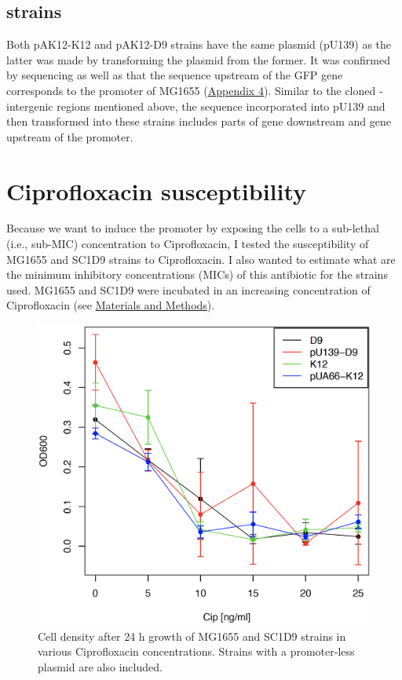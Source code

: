 \subsection{ strains}
Both pA\textunderscore K12-K12 and pA\textunderscore K12-D9 strains have the same plasmid (pU139) as the latter was made by transforming the plasmid from the former.
It was confirmed by sequencing as well as that the sequence upstream of the GFP gene corresponds to the  promoter of MG1655 (\hyperlink{precAalign}{Appendix 4}).
Similar to the cloned - intergenic regions mentioned above, the sequence incorporated into pU139 and then transformed into these  strains includes parts of  gene downstream and  gene upstream of the promoter.


\section{Ciprofloxacin susceptibility}
Because we want to induce the  promoter by exposing the cells to a sub-lethal (i.e., sub-MIC) concentration to Ciprofloxacin, I tested the susceptibility of MG1655 and SC1\textunderscore D9 strains to Ciprofloxacin.
I also wanted to estimate what are the minimum inhibitory concentrations (MICs) of this antibiotic for the strains used.
MG1655 and SC1\textunderscore D9 were incubated in an increasing concentration of Ciprofloxacin (see \hyperlink{MIC}{Materials and Methods}).
\begin{figure}[b!]
  \centering
  \includegraphics[scale=0.25]{text/Pictures/KillCurve.png}
    \caption{Cell density after 24 h growth of MG1655 and SC1\textunderscore D9 strains in various Ciprofloxacin concentrations. Strains with a promoter-less plasmid are also included.}
    \label{killing}
\end{figure}
